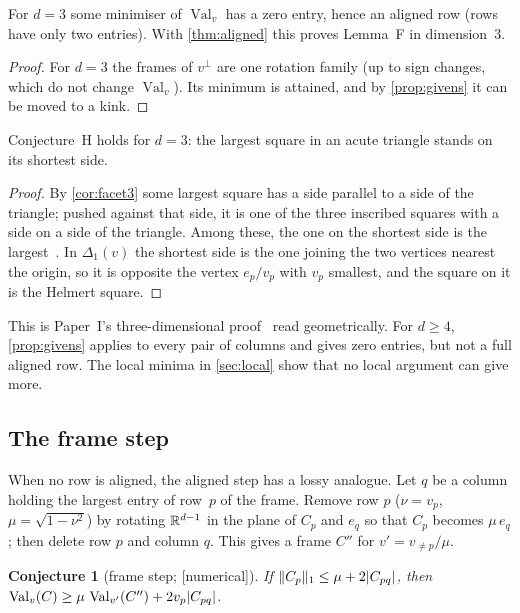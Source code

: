 \documentclass[11pt,a4paper]{article}
\newtheorem{conjecture}[theorem]{Conjecture}
\newcommand{\status}[1]{\textsf{\small[#1]}}
\newcommand{\Val}{\operatorname{Val}}
\begin{document}
\begin{corollary}[facet lemma for $d=3$; \status{proof}]\label{cor:facet3}
For $d=3$ some minimiser of $\Val_v$ has a zero entry, hence an aligned row (rows have only two entries). With \cref{thm:aligned} this proves Lemma~F in dimension~$3$.
\end{corollary}
\begin{proof}
For $d=3$ the frames of $v^\perp$ are one rotation family (up to sign changes, which do not change $\Val_v$). Its minimum is attained, and by \cref{prop:givens} it can be moved to a kink.
\end{proof}

\begin{corollary}[Conjecture~H for $d=3$; \status{proof}, \status{literature}]\label{cor:H3}
Conjecture~H holds for $d=3$: the largest square in an acute triangle stands on its shortest side.
\end{corollary}
\begin{proof}
By \cref{cor:facet3} some largest square has a side parallel to a side of the triangle; pushed against that side, it is one of the three inscribed squares with a side on a side of the triangle. Among these, the one on the shortest side is the largest~\cite{baileydetemple}. In $\Delta_1(v)$ the shortest side is the one joining the two vertices nearest the origin, so it is opposite the vertex $e_p/v_p$ with $v_p$ smallest, and the square on it is the Helmert square.
\end{proof}

This is Paper~I's three-dimensional proof~\cite[\S4]{cubecentre} read geometrically. For $d\ge4$, \cref{prop:givens} applies to every pair of columns and gives zero entries, but not a full aligned row. The local minima in \cref{sec:local} show that no local argument can give more.

\subsection{The frame step}\label{sec:framestep}
When no row is aligned, the aligned step has a lossy analogue. Let $q$ be a column holding the largest entry of row~$p$ of the frame. Remove row $p$ ($\nu=v_p$, $\mu=\sqrt{1-\nu^2}$) by rotating $\mathbb R^{d-1}$ in the plane of $C_p$ and $e_q$ so that $C_p$ becomes $\mu\,e_q$; then delete row $p$ and column $q$. This gives a frame $C''$ for $v'=v_{\ne p}/\mu$.

\begin{conjecture}[frame step; \status{numerical}]\label{conj:star}
If $\lVert C_p\rVert_1\le\mu+2\lvert C_{pq}\rvert$, then $\Val_v(C)\ge\mu\,\Val_{v'}(C'')+2v_p\abs{C_{pq}}$.
\end{conjecture}
\end{document}
